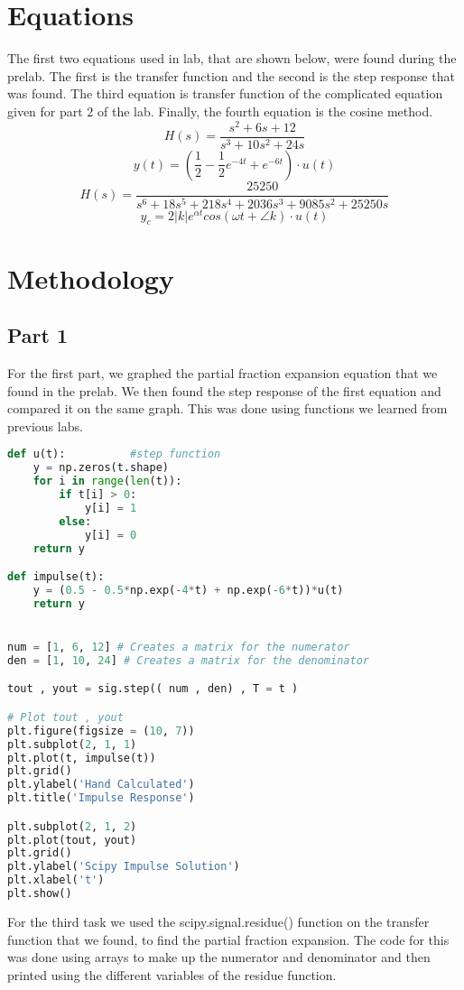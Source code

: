 \documentclass[12pt]{report}
\begin{document}
\section{Equations}
The first two equations used in lab, that are shown below, were found during the 
prelab. The first is the transfer function and the second is the 
step response that was found. The third equation is transfer function of the
complicated equation given for part 2 of the lab. Finally, the fourth equation
is the cosine method.
\begin{equation}
    H(s) = \frac{s^{2} + 6s + 12}{s^{3} + 10s^{2} + 24s}
\end{equation}
\begin{equation}
    y(t) = (\frac{1}{2} - \frac{1}{2}e^{-4t} + e^{-6t}) \cdot u(t)
\end{equation}
\begin{equation}
    H(s) = \frac{25250}{s^{6} + 18s^{5} + 218s^{4} + 2036s^{3} + 9085s^{2} + 25250s}
\end{equation}
\begin{equation}
    y_{c} = 2|k|e^{\alpha t}cos(\omega t +	\angle k) \cdot u(t)
\end{equation}

\section{Methodology}
\subsection{Part 1}
For the first part, we graphed the partial fraction expansion equation
that we found in the prelab. We then found the step response of the first 
equation and compared it on the same graph. This was done using functions
we learned from previous labs. 

\begin{lstlisting}[language=Python]
def u(t):          #step function
    y = np.zeros(t.shape)
    for i in range(len(t)):
        if t[i] > 0:
            y[i] = 1
        else:
            y[i] = 0
    return y

def impulse(t):
    y = (0.5 - 0.5*np.exp(-4*t) + np.exp(-6*t))*u(t)
    return y


num = [1, 6, 12] # Creates a matrix for the numerator
den = [1, 10, 24] # Creates a matrix for the denominator

tout , yout = sig.step(( num , den) , T = t )

# Plot tout , yout
plt.figure(figsize = (10, 7))
plt.subplot(2, 1, 1)
plt.plot(t, impulse(t))
plt.grid()
plt.ylabel('Hand Calculated')
plt.title('Impulse Response')

plt.subplot(2, 1, 2)
plt.plot(tout, yout)
plt.grid()
plt.ylabel('Scipy Impulse Solution') 
plt.xlabel('t')
plt.show()
\end{lstlisting}
For the third task we used the scipy.signal.residue() function on the 
transfer function that we found, to find the partial fraction 
expansion. The code for this was done using arrays to make up the
numerator and denominator and then printed using the different variables
of the residue function.
\end{document}
